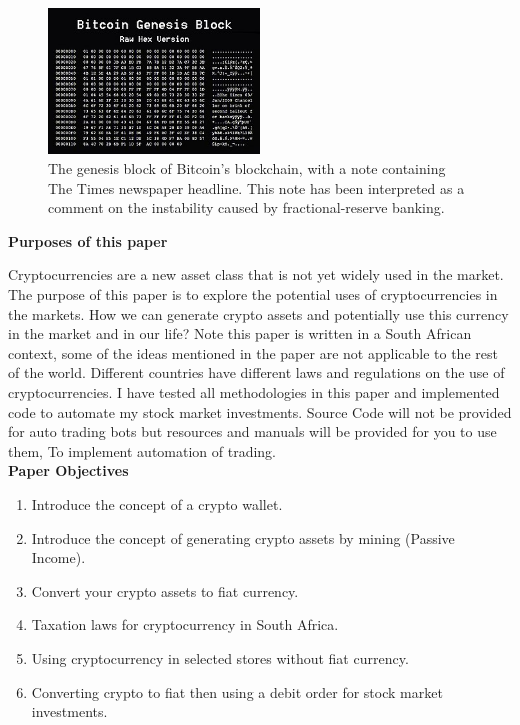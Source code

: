 \begin{figure}[H]
\centering
\includegraphics[width=0.5\textwidth]{images/Bitcoin-Genesis-block.jpg}
\caption{The genesis block of Bitcoin's blockchain, with a note containing The Times newspaper headline. This note has been interpreted as a comment on the instability caused by fractional-reserve banking.}
\label{fig:bitcoin-genesis-block}
\end{figure}

\textbf{Purposes of this paper}

Cryptocurrencies are a new asset class that is not yet widely used in the market. The purpose of
this paper is to explore the potential uses of cryptocurrencies in the markets. How we can generate
crypto assets and potentially use this currency in the market and in our life?
Note this paper is written in a South African context, some of the ideas mentioned in the paper
are not applicable to the rest of the world. Different countries have different laws and regulations on
the use of cryptocurrencies.
I have tested all methodologies in this paper and implemented code to automate my stock market
investments. Source Code will not be provided for auto trading bots but resources and manuals will
be provided for you to use them, To implement automation of trading. \\

\textbf{Paper Objectives}

\begin{enumerate}
\item Introduce the concept of a crypto wallet.
\item Introduce the concept of generating crypto assets by mining (Passive Income).
\item Convert your crypto assets to fiat currency.
\item Taxation laws for cryptocurrency in South Africa.
\item Using cryptocurrency in selected stores without fiat currency.
\item Converting crypto to fiat then using a debit order for stock market investments.
\end{enumerate}


 